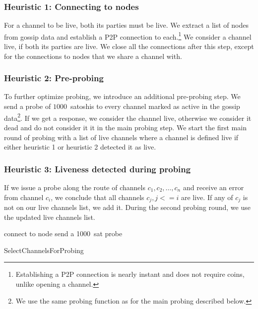 \subsubsection{Heuristic 1: Connecting to nodes}
For a channel to be live, both its parties must be live.
We extract a list of nodes from gossip data and establish a P2P connection to each.\footnote{Establishing a P2P connection is nearly instant and does not require coins, unlike opening a channel.}
We consider a channel live, if both its parties are live.
We close all the connections after this step, except for the connections to nodes that we share a channel with.

\subsubsection{Heuristic 2: Pre-probing}
To further optimize probing, we introduce an additional pre-probing step.
We send a probe of $1000$~satoshis to every channel marked as active in the gossip data\footnote{We use the same probing function as for the main probing described below.}.
If we get a response, we consider the channel live, otherwise we consider it dead and do not consider it it in the main probing step.
We start the first main round of probing with a list of live channels where a channel is defined live if either heuristic 1 or heuristic 2 detected it as live.

\subsubsection{Heuristic 3: Liveness detected during probing}
If we issue a probe along the route of channels $c_1, c_2, \dots, c_n$ and receive an error from channel $c_i$, we conclude that all channels $c_j, j<=i$ are live.
If any of $c_j$ is not on our live channels list, we add it.
During the second probing round, we use the updated live channels list.

\begin{algorithm}
	 {
		connect to node\;
	}
	 {
		send a 1000~sat probe\;
	}
	\caption{SelectChannelsForProbing}
	\label{alg:select-channels}
\end{algorithm}


